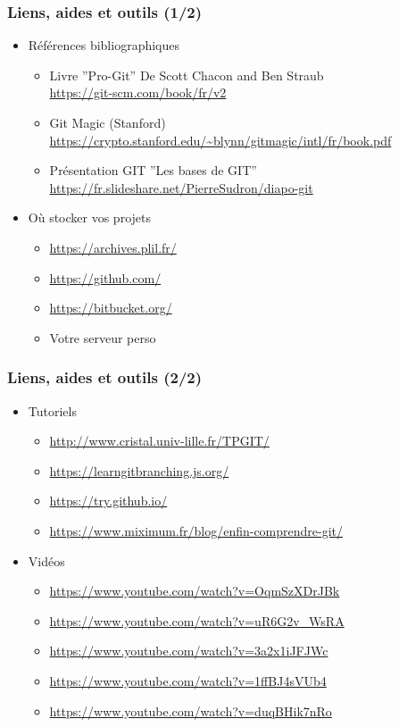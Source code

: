 \documentclass[table,tikz,12pt,svgnames]{beamer}
\begin{document}
\begin{frame}
\frametitle{Liens, aides et outils (1/2)}
\begin{itemize}
	\item Références bibliographiques
	\begin{itemize}
		\item Livre ”Pro-Git” De Scott Chacon and Ben Straub\\
		\url{https://git-scm.com/book/fr/v2}
		\item Git Magic (Stanford)\\
		\url{https://crypto.stanford.edu/~blynn/gitmagic/intl/fr/book.pdf}
		\item Présentation GIT ”Les bases de GIT”
		\url{https://fr.slideshare.net/PierreSudron/diapo-git}

	\end{itemize}
	\vspace{1em}

	\item Où stocker vos projets
	\begin{itemize}
		\item \url{https://archives.plil.fr/}
		\item \url{https://github.com/}
		\item \url{https://bitbucket.org/}
		\item Votre serveur perso
	\end{itemize}
\end{itemize}
\end{frame}

\begin{frame}
\frametitle{Liens, aides et outils (2/2)}
\begin{itemize}
	\item Tutoriels
	\begin{itemize}
		\item \url{http://www.cristal.univ-lille.fr/TPGIT/}
		\item \url{https://learngitbranching.js.org/}
		\item \url{https://try.github.io/}
		\item \url{https://www.miximum.fr/blog/enfin-comprendre-git/}
	\end{itemize}
	\item Vidéos
	\begin{itemize}
		\item \url{https://www.youtube.com/watch?v=OqmSzXDrJBk}
		\item \url{https://www.youtube.com/watch?v=uR6G2v_WsRA}
		\item \url{https://www.youtube.com/watch?v=3a2x1iJFJWc}
		\item \url{https://www.youtube.com/watch?v=1ffBJ4sVUb4}
		\item \url{https://www.youtube.com/watch?v=duqBHik7nRo}
	\end{itemize}
\end{itemize}
\end{frame}


\end{document}
